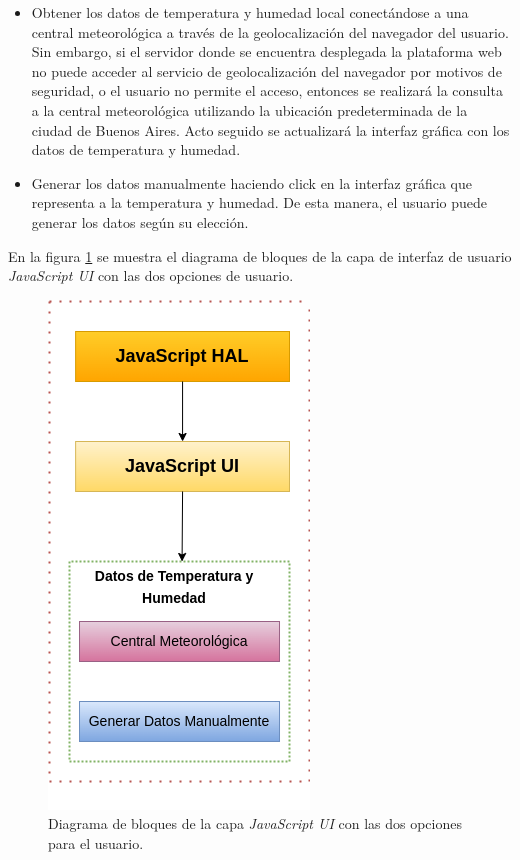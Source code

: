  \begin{itemize}
	\item Obtener los datos de temperatura y humedad local conectándose a una central meteorológica a través de la geolocalización del navegador del usuario. Sin embargo, si el servidor donde se encuentra desplegada la plataforma web no puede acceder al servicio de geolocalización del navegador por motivos de seguridad, o el usuario no permite el acceso, entonces se realizará la consulta a la central meteorológica utilizando la ubicación predeterminada de la ciudad de Buenos Aires. Acto seguido se actualizará la interfaz gráfica con los datos de temperatura y humedad.
	
	\item Generar los datos manualmente haciendo click en la interfaz gráfica que representa a la temperatura y humedad. De esta manera, el usuario puede generar los datos según su elección.
\end{itemize}

En la figura \ref{fig:uiDht11} se muestra el diagrama de bloques de la capa de interfaz de usuario \textit{JavaScript UI} con las dos opciones de usuario.

\begin{figure}[ht]
	\centering
	\includegraphics[scale=.53]{./Figures/uiDht11.png}
	\caption{Diagrama de bloques de la capa \textit{JavaScript UI} con las dos opciones para el usuario.}
	\label{fig:uiDht11}
\end{figure}

